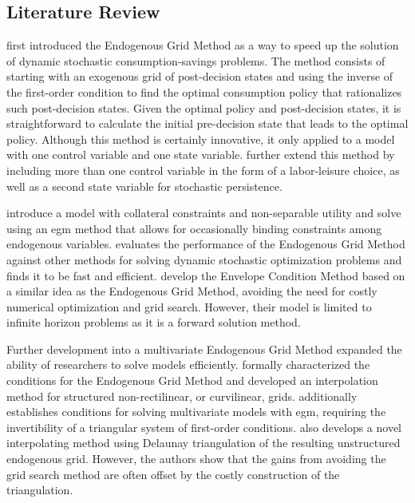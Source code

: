 \documentclass{article}
\begin{document}
\subsection{Literature Review}



\citet{Carroll2006} first introduced the Endogenous Grid Method as a way to speed up the solution of dynamic stochastic consumption-savings problems. The method consists of starting with an exogenous grid of post-decision states and using the inverse of the first-order condition to find the optimal consumption policy that rationalizes such post-decision states. Given the optimal policy and post-decision states, it is straightforward to calculate the initial pre-decision state that leads to the optimal policy. Although this method is certainly innovative, it only applied to a model with one control variable and one state variable. \citet{Barillas2007} further extend this method by including more than one control variable in the form of a labor-leisure choice, as well as a second state variable for stochastic persistence.

\citet{Hintermaier2010} introduce a model with collateral constraints and non-separable utility and solve using an \acrshort{egm} method that allows for occasionally binding constraints among endogenous variables. \citet{Jorgensen2013} evaluates the performance of the Endogenous Grid Method against other methods for solving dynamic stochastic optimization problems and finds it to be fast and efficient. \citet{Maliar2013} develop the Envelope Condition Method based on a similar idea as the Endogenous Grid Method, avoiding the need for costly numerical optimization and grid search. However, their model is limited to infinite horizon problems as it is a forward solution method.

Further development into a multivariate Endogenous Grid Method expanded the ability of researchers to solve models efficiently. \citet{White2015} formally characterized the conditions for the Endogenous Grid Method and developed an interpolation method for structured non-rectilinear, or curvilinear, grids. \citet{Iskhakov2015} additionally establishes conditions for solving multivariate models with \acrshort{egm}, requiring the invertibility of a triangular system of first-order conditions. \citet{Ludwig2018} also develops a novel interpolating method using Delaunay triangulation of the resulting unstructured endogenous grid. However, the authors show that the gains from avoiding the grid search method are often offset by the costly construction of the triangulation.
\end{document}
